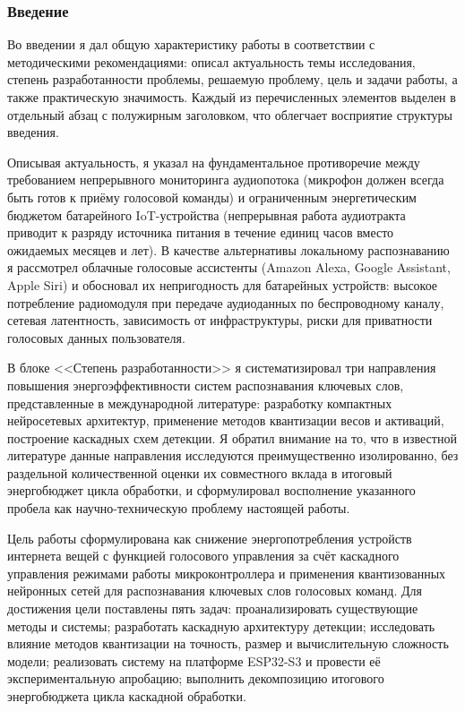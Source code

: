 \subsubsection{Введение}

Во введении я дал общую характеристику работы в соответствии с
методическими рекомендациями: описал актуальность темы исследования,
степень разработанности проблемы, решаемую проблему, цель и задачи
работы, а также практическую значимость. Каждый из перечисленных
элементов выделен в отдельный абзац с полужирным заголовком, что
облегчает восприятие структуры введения.

Описывая актуальность, я указал на фундаментальное противоречие
между требованием непрерывного мониторинга аудиопотока (микрофон
должен всегда быть готов к приёму голосовой команды) и
ограниченным энергетическим бюджетом батарейного IoT-устройства
(непрерывная работа аудиотракта приводит к разряду источника
питания в течение единиц часов вместо ожидаемых месяцев и лет).
В качестве альтернативы локальному распознаванию я рассмотрел
облачные голосовые ассистенты (Amazon Alexa, Google Assistant,
Apple Siri) и обосновал их непригодность для батарейных
устройств: высокое потребление радиомодуля при передаче
аудиоданных по беспроводному каналу, сетевая латентность,
зависимость от инфраструктуры, риски для приватности голосовых
данных пользователя.

В блоке <<Степень разработанности>> я систематизировал три
направления повышения энергоэффективности систем распознавания
ключевых слов, представленные в международной литературе:
разработку компактных нейросетевых архитектур, применение
методов квантизации весов и активаций, построение каскадных
схем детекции. Я обратил внимание на то, что в известной
литературе данные направления исследуются преимущественно
изолированно, без раздельной количественной оценки их
совместного вклада в итоговый энергобюджет цикла обработки,
и сформулировал восполнение указанного пробела как
научно-техническую проблему настоящей работы.

Цель работы сформулирована как снижение энергопотребления
устройств интернета вещей с функцией голосового управления за
счёт каскадного управления режимами работы микроконтроллера и
применения квантизованных нейронных сетей для распознавания
ключевых слов голосовых команд. Для достижения цели поставлены
пять задач: проанализировать существующие методы и системы;
разработать каскадную архитектуру детекции; исследовать влияние
методов квантизации на точность, размер и вычислительную
сложность модели; реализовать систему на платформе ESP32-S3 и
провести её экспериментальную апробацию; выполнить декомпозицию
итогового энергобюджета цикла каскадной обработки.

